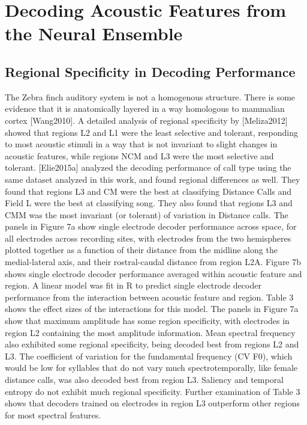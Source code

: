 \chapter{Decoding Acoustic Features from the Neural Ensemble}

\section{Regional Specificity in Decoding Performance}

    The Zebra finch auditory system is not a homogenous structure. There is some evidence that it is anatomically layered in a way homologous to mammalian cortex [Wang2010]. A detailed analysis of regional specificity by [Meliza2012] showed that regions L2 and L1 were the least selective and tolerant, responding to most acoustic stimuli in a way that is not invariant to slight changes in acoustic features, while regions NCM and L3 were the most selective and tolerant. [Elie2015a] analyzed the decoding performance of call type using the same dataset analyzed in this work, and found regional differences as well. They found that regions L3 and CM were the best at classifying Distance Calls and Field L were the best at classifying song. They also found that regions L3 and CMM was the most invariant (or tolerant) of variation in Distance calls.
    The panels in Figure 7a show single electrode decoder performance across space, for all electrodes across recording sites, with electrodes from the two hemispheres plotted together as a function of their distance from the midline along the medial-lateral axis, and their rostral-caudal distance from region L2A. Figure 7b shows single electrode decoder performance averaged within acoustic feature and region. A linear model was fit in R to predict single electrode decoder performance from the interaction between acoustic feature and region. Table 3 shows the effect sizes of the interactions for this model. The panels in Figure 7a show that maximum amplitude has some region specificity, with electrodes in region L2 containing the most amplitude information. Mean spectral frequency also exhibited some regional specificity, being decoded best from regions L2 and L3. The coefficient of variation for the fundamental frequency (CV F0), which would be low for syllables that do not vary much spectrotemporally, like female distance calls, was also decoded best from region L3. Saliency and temporal entropy do not exhibit much regional specificity. Further examination of Table 3 shows that decoders trained on electrodes in region L3 outperform other regions for most spectral features.

